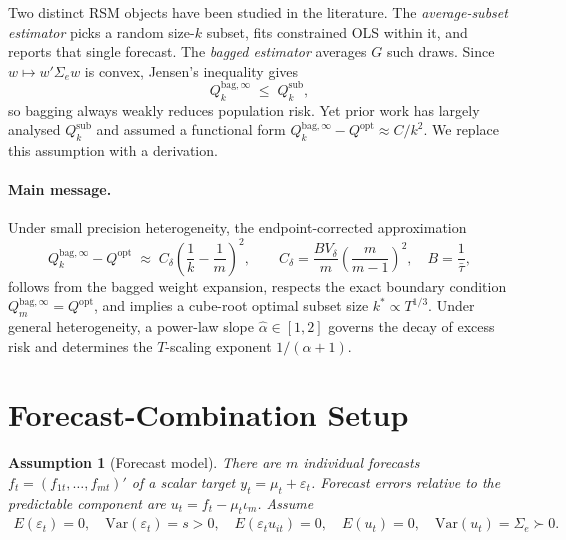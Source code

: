 \documentclass[12pt,a4paper]{article}
\newtheorem{assumption}{Assumption}
\theoremstyle{definition}
\begin{document}
Two distinct RSM objects have been studied in the literature. The
\emph{average-subset estimator} picks a random size-$k$ subset, fits
constrained OLS within it, and reports that single forecast. The
\emph{bagged estimator} averages $G$ such draws. Since $w\mapsto w'\Sigma_e w$
is convex, Jensen's inequality gives
\begin{equation}
Q_k^{\mathrm{bag},\infty} \;\leq\; Q_k^{\mathrm{sub}},
\end{equation}
so bagging always weakly reduces population risk. Yet prior work has largely
analysed $Q_k^{\mathrm{sub}}$ and assumed a functional form
$Q_k^{\mathrm{bag},\infty}-Q^{\mathrm{opt}}\approx C/k^2$. We replace
this assumption with a derivation.

\paragraph{Main message.}
Under small precision heterogeneity, the endpoint-corrected approximation
\begin{equation}
Q_k^{\mathrm{bag},\infty} - Q^{\mathrm{opt}}
\;\approx\; C_\delta\!\left(\frac{1}{k}-\frac{1}{m}\right)^{\!2}, \qquad
C_\delta = \frac{BV_\delta}{m}\!\left(\frac{m}{m-1}\right)^2,
\quad B = \frac{1}{\bar\tau},
\end{equation}
follows from the bagged weight expansion, respects the exact boundary
condition $Q_m^{\mathrm{bag},\infty}=Q^{\mathrm{opt}}$, and implies a
cube-root optimal subset size $k^*\propto T^{1/3}$. Under general
heterogeneity, a power-law slope $\hat\alpha\in[1,2]$ governs the decay
of excess risk and determines the $T$-scaling exponent $1/(\alpha+1)$.

\section{Forecast-Combination Setup}

\begin{assumption}[Forecast model]\label{ass:fc}
There are $m$ individual forecasts $f_t=(f_{1t},\ldots,f_{mt})'$ of a
scalar target $y_t=\mu_t+\varepsilon_t$. Forecast errors relative to the
predictable component are $u_t=f_t-\mu_t\iota_m$. Assume
\begin{align*}
E(\varepsilon_t)=0,\quad \mathrm{Var}(\varepsilon_t)=s>0,\quad
E(\varepsilon_t u_{it})=0,\quad
E(u_t)=0,\quad \mathrm{Var}(u_t)=\Sigma_e\succ 0.
\end{align*}
\end{assumption}
\end{document}
